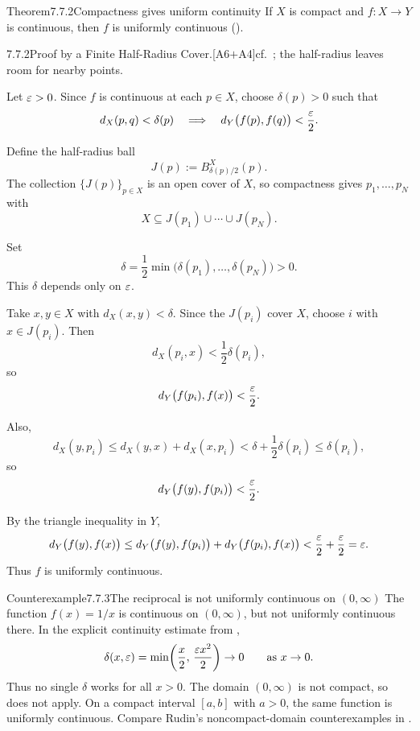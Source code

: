 \documentclass[main.tex]{subfiles}
\begin{document}
\begin{Obj}{Theorem}{7.7.2}{Compactness gives uniform continuity}
If $X$ is compact and $f:X\to Y$ is continuous, then $f$ is uniformly continuous ().
\end{Obj}
\begin{Prf}{7.7.2}{Proof by a Finite Half-Radius Cover.}{[A6$+$A4]\quad cf.\ ; the half-radius leaves room for nearby points.}
\item Let $\varepsilon>0$. Since $f$ is continuous at each $p\in X$, choose $\delta(p)>0$ such that
  \[
    d_X(p,q)<\delta(p)
    \quad\Longrightarrow\quad
    d_Y\bigl(f(p),f(q)\bigr)<\frac{\varepsilon}{2}.
  \]
\item Define the half-radius ball
  \[
    J(p):=B^X_{\delta(p)/2}(p).
  \]
  The collection $\{J(p)\}_{p\in X}$ is an open cover of $X$, so compactness gives
  $p_1,\dots,p_N$ with
  \[
    X\subseteq J(p_1)\cup\cdots\cup J(p_N).
  \]
\item Set
  \[
    \delta=\frac12\min\bigl(\delta(p_1),\dots,\delta(p_N)\bigr)>0 .
  \]
  This $\delta$ depends only on $\varepsilon$.
\item Take $x,y\in X$ with $d_X(x,y)<\delta$. Since the $J(p_i)$ cover $X$, choose $i$ with
  $x\in J(p_i)$. Then
  \[
    d_X(p_i,x)<\frac12\delta(p_i),
  \]
  so
  \[
    d_Y\bigl(f(p_i),f(x)\bigr)<\frac{\varepsilon}{2}.
  \]
\item Also,
  \[
    d_X(y,p_i)\le d_X(y,x)+d_X(x,p_i)
    <\delta+\frac12\delta(p_i)
    \le\delta(p_i),
  \]
  so
  \[
    d_Y\bigl(f(y),f(p_i)\bigr)<\frac{\varepsilon}{2}.
  \]
\item By the triangle inequality in $Y$,
  \[
    d_Y\bigl(f(y),f(x)\bigr)
    \le d_Y\bigl(f(y),f(p_i)\bigr)+d_Y\bigl(f(p_i),f(x)\bigr)
    <\frac{\varepsilon}{2}+\frac{\varepsilon}{2}
    =\varepsilon .
  \]
  Thus $f$ is uniformly continuous.
\end{Prf}

\begin{Obj}{Counterexample}{7.7.3}{The reciprocal is not uniformly continuous on $(0,\infty)$}
The function $f(x)=1/x$ is continuous on $(0,\infty)$, but not uniformly continuous there. In the
explicit continuity estimate from ,
\[
  \delta(x,\varepsilon)=\min\!\left(\frac{x}{2},\,\frac{\varepsilon x^2}{2}\right)\to0
  \qquad\text{as }x\to0.
\]
Thus no single $\delta$ works for all $x>0$. The domain $(0,\infty)$ is not compact, so
 does not apply. On a compact interval $[a,b]$ with $a>0$, the same function is
uniformly continuous. Compare Rudin's noncompact-domain counterexamples in .
\end{Obj}
\end{document}
